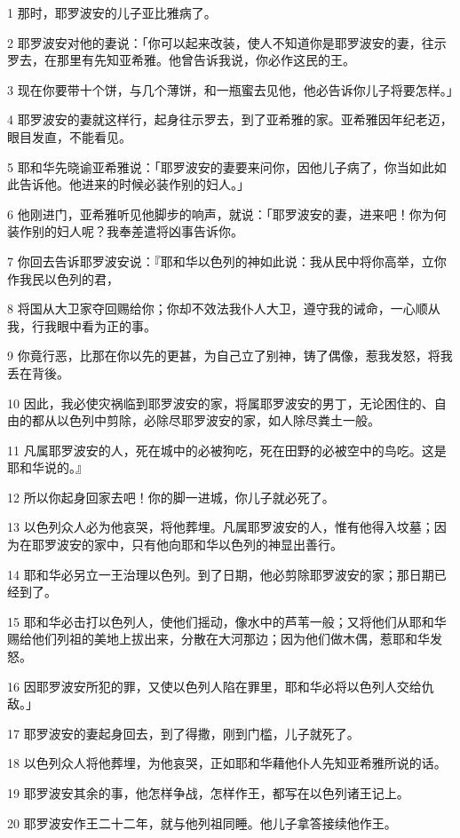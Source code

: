 \par 1 那时，耶罗波安的儿子亚比雅病了。
\par 2 耶罗波安对他的妻说：「你可以起来改装，使人不知道你是耶罗波安的妻，往示罗去，在那里有先知亚希雅。他曾告诉我说，你必作这民的王。
\par 3 现在你要带十个饼，与几个薄饼，和一瓶蜜去见他，他必告诉你儿子将要怎样。」
\par 4 耶罗波安的妻就这样行，起身往示罗去，到了亚希雅的家。亚希雅因年纪老迈，眼目发直，不能看见。
\par 5 耶和华先晓谕亚希雅说：「耶罗波安的妻要来问你，因他儿子病了，你当如此如此告诉他。他进来的时候必装作别的妇人。」
\par 6 他刚进门，亚希雅听见他脚步的响声，就说：「耶罗波安的妻，进来吧！你为何装作别的妇人呢？我奉差遣将凶事告诉你。
\par 7 你回去告诉耶罗波安说：『耶和华以色列的神如此说：我从民中将你高举，立你作我民以色列的君，
\par 8 将国从大卫家夺回赐给你；你却不效法我仆人大卫，遵守我的诫命，一心顺从我，行我眼中看为正的事。
\par 9 你竟行恶，比那在你以先的更甚，为自己立了别神，铸了偶像，惹我发怒，将我丢在背後。
\par 10 因此，我必使灾祸临到耶罗波安的家，将属耶罗波安的男丁，无论困住的、自由的都从以色列中剪除，必除尽耶罗波安的家，如人除尽粪土一般。
\par 11 凡属耶罗波安的人，死在城中的必被狗吃，死在田野的必被空中的鸟吃。这是耶和华说的。』
\par 12 所以你起身回家去吧！你的脚一进城，你儿子就必死了。
\par 13 以色列众人必为他哀哭，将他葬埋。凡属耶罗波安的人，惟有他得入坟墓；因为在耶罗波安的家中，只有他向耶和华以色列的神显出善行。
\par 14 耶和华必另立一王治理以色列。到了日期，他必剪除耶罗波安的家；那日期已经到了。
\par 15 耶和华必击打以色列人，使他们摇动，像水中的芦苇一般；又将他们从耶和华赐给他们列祖的美地上拔出来，分散在大河那边；因为他们做木偶，惹耶和华发怒。
\par 16 因耶罗波安所犯的罪，又使以色列人陷在罪里，耶和华必将以色列人交给仇敌。」
\par 17 耶罗波安的妻起身回去，到了得撒，刚到门槛，儿子就死了。
\par 18 以色列众人将他葬埋，为他哀哭，正如耶和华藉他仆人先知亚希雅所说的话。
\par 19 耶罗波安其余的事，他怎样争战，怎样作王，都写在以色列诸王记上。
\par 20 耶罗波安作王二十二年，就与他列祖同睡。他儿子拿答接续他作王。
